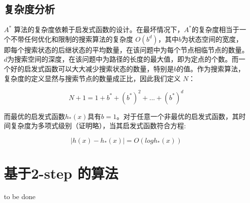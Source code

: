 \documentclass{standalone}
\begin{document}
\subsection{复杂度分析}
$A^{*}$ 算法的复杂度依赖于启发式函数的设计。在最坏情况下，$A^{*}$的复杂度相当于一个不带任何优化和限制的搜索算法的复杂度 $O(b^d)$，其中$b$为状态空间的宽度，即每个搜索状态的后继状态的平均数量，在该问题中为每个节点相临节点的数量。$d$为搜索空间的深度，在该问题中为路径的长度的最大值，即为定点的个数。而一个好的启发式函数可以大大减少搜索状态的数量，特别是$b$的值。作为搜索算法，复杂度的定义显然与搜索节点的数量成正比，因此我们定义 $N$： 
\begin{center}
    \begin{equation}
        N + 1 = 1 + b^* + (b^*)^2 + ... + (b^*)^d
    \end{equation}
\end{center}
而最优的启发式函数$h_*(x)$具有$b=1$。对于任意一个非最优的启发式函数，其时间复杂度为多项式级别（证明略），当其启发式函数符合方程:
\begin{center}
    \begin{equation}
        |h(x) - h_*(x)| = O(logh_*(x))
    \end{equation}
\end{center}
\section{基于2-step 的算法}
to be done
\end{document}
